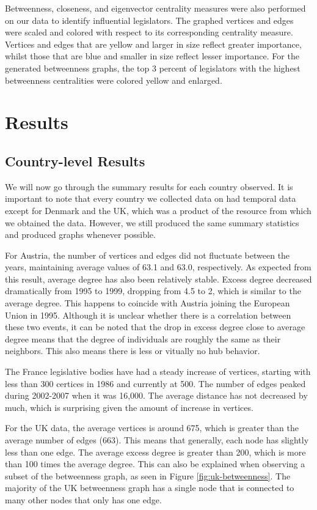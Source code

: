 \documentclass[12pt]{article}
\begin{document}
\begin{multicols*}{2}
Betweenness, closeness, and eigenvector centrality measures were also performed on our data to identify influential legislators. The graphed vertices and edges were scaled and colored with respect to its corresponding centrality measure. Vertices and edges that are yellow and larger in size reflect greater importance, whilst those that are blue and smaller in size reflect lesser importance. For the generated betweenness graphs, the top 3 percent of legislators with the highest betweenness centralities were colored yellow and enlarged.

\section{Results}
\subsection{Country-level Results}
We will now go through the summary results for each country observed. It is important to note that every country we collected data on had temporal data except for Denmark and the UK, which was a product of the resource from which we obtained the data. However, we still produced the same summary statistics and produced graphs whenever possible.

For Austria, the number of vertices and edges did not fluctuate between the years, maintaining average values of 63.1 and 63.0, respectively. As expected from this result, average degree has also been relatively stable. Excess degree decreased dramatically from 1995 to 1999, dropping from 4.5 to 2, which is similar to the average degree. This happens to coincide with Austria joining the European Union in 1995. Although it is unclear whether there is a correlation between these two events, it can be noted that the drop in excess degree close to average degree means that the degree of individuals are roughly the same as their neighbors. This also means there is less or vitually no hub behavior.

The France legislative bodies have had a steady increase of vertices, starting with less than 300 certices in 1986 and currently at 500. The number of edges peaked during 2002-2007 when it was 16,000. The average distance has not decreased by much, which is surprising given the amount of increase in vertices.

For the UK data, the average vertices is around 675, which is greater than the average number of edges (663). This means that generally, each node has slightly less than one edge. The average excess degree is greater than 200, which is more than 100 times the average degree. This can also be explained when observing a subset of the betweenness graph, as seen in Figure \ref{fig:uk-betweenness}. The majority of the UK betweenness graph has a single node that is connected to many other nodes that only has one edge. 


\end{multicols*}
\end{document}
